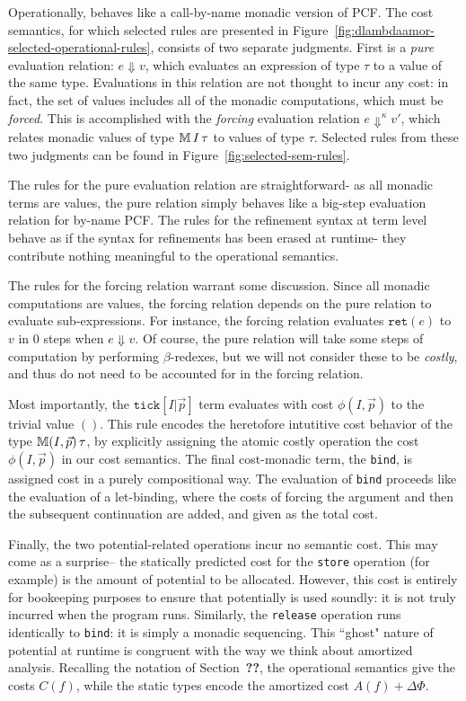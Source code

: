 Operationally, \dlambdaamor behaves like a call-by-name monadic version of PCF. The cost semantics, for which selected rules are presented in Figure~\ref{fig:dlambdaamor-selected-operational-rules}, consists of two separate judgments. First is a \textit{pure} evaluation relation: $e \Downarrow v$, which evaluates an expression of type $\tau$ to a value of the same type. Evaluations in this relation are not thought to incur any cost: in fact, the set of values includes all of the monadic computations, which must be \textit{forced}. This is accomplished with the \textit{forcing} evaluation relation $e \Downarrow^\kappa v'$, which relates monadic values of type $\mathbb{M} \, I \, \tau$ to values of type $\tau$. Selected rules from these two judgments can be found in Figure~\ref{fig:selected-sem-rules}.

The rules for the pure evaluation relation are straightforward- as all monadic terms are values, the pure relation simply behaves like a big-step evaluation relation for by-name PCF. The rules for the refinement syntax at term level behave as if the syntax for refinements has been erased at runtime- they contribute nothing meaningful to the operational semantics.

The rules for the forcing relation warrant some discussion. Since all monadic computations are values, the forcing relation depends on the pure relation to evaluate sub-expressions. For instance, the forcing relation evaluates $\texttt{ret}(e)$ to $v$ in $0$ steps when $e \Downarrow v$. Of course, the pure relation will take some steps of computation by performing $\beta$-redexes, but we will not consider these to be \textit{costly}, and thus do not need to be accounted for in the forcing relation.

Most importantly, the $\texttt{tick}[I|\vec{p}]$ term evaluates with cost $\phi(I,\vec{p})$ to the trivial value $()$. This rule encodes the heretofore intutitive cost behavior of the type $\mathbb{M} (I,\vec{p}) \, \tau$, by explicitly assigning the atomic costly operation the cost $\phi(I,\vec{p})$ in our cost semantics.  The final cost-monadic term, the \texttt{bind}, is assigned cost in a purely compositional way. The evaluation of \texttt{bind} proceeds like the evaluation of a let-binding, where the costs of forcing the argument and then the subsequent continuation are added, and given as the total cost.

Finally, the two potential-related operations incur no semantic cost. This may come as a surprise-- the statically predicted cost for the \texttt{store} operation (for example) is the amount of potential to be allocated. However, this cost is entirely for bookeeping purposes to ensure that potentially is used soundly: it is not truly incurred when the program runs. Similarly, the \texttt{release} operation runs identically to \texttt{bind}: it is simply a monadic sequencing. This ``ghost" nature of potential at runtime is congruent with the way we think about amortized analysis. Recalling the notation of Section~\textbf{??}, the operational semantics give the costs $C(f)$, while the static types encode the amortized cost $A(f) + \Delta\Phi$.

